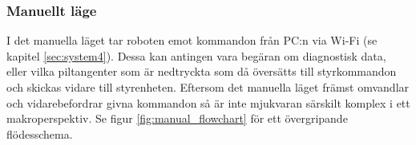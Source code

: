 \documentclass[a4paper,11pt]{article}
\begin{document}

\subsubsection{Manuellt läge}
I det manuella läget tar roboten emot kommandon från PC:n via Wi-Fi (se kapitel \ref{sec:system4}). Dessa kan antingen vara begäran om diagnostisk data, eller vilka piltangenter som är nedtryckta som då översätts till styrkommandon och skickas vidare till styrenheten. Eftersom det manuella läget främst omvandlar och vidarebefordrar givna kommandon så är inte mjukvaran särskilt komplex i ett makroperspektiv. Se figur \ref{fig:manual_flowchart} för ett övergripande flödesschema.
\end{document}
